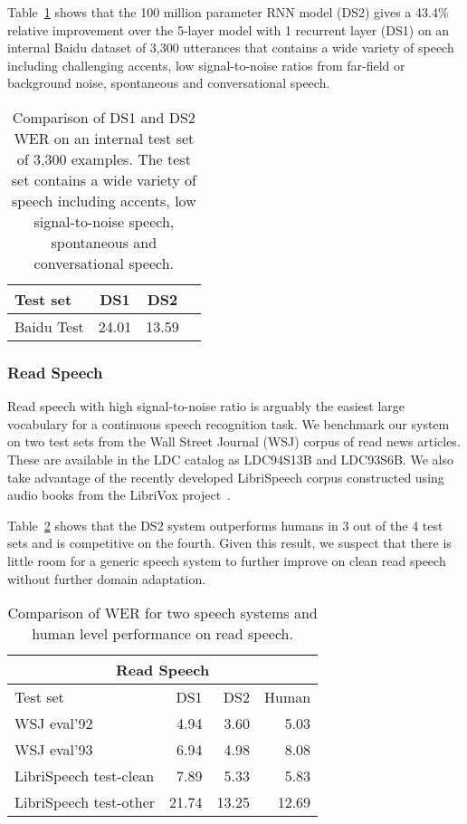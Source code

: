Table~\ref{table:deepspeech2:test} shows that the 100 million parameter RNN
model (DS2) gives a 43.4\% relative improvement over the 5-layer model with 1
recurrent layer (DS1) on an internal Baidu dataset of 3,300 utterances that
contains a wide variety of speech including challenging accents, low
signal-to-noise ratios from far-field or background noise, spontaneous and
conversational speech. 

\begin{table}
\centering
\begin{tabular}{l  c  c  c}
\toprule
Test set   & DS1 & DS2 \\
\midrule
Baidu Test & 24.01  & 13.59 \\
\bottomrule
\end{tabular}
\caption{Comparison of DS1 and DS2 WER on an internal test set of 3,300
    examples. The test set contains a wide variety of speech including accents,
    low signal-to-noise speech, spontaneous and conversational speech.}
\label{table:deepspeech2:test}
\end{table}

\subsubsection{Read Speech}

Read speech with high signal-to-noise ratio is arguably the easiest large
vocabulary for a continuous speech recognition task. We benchmark our system on
two test sets from the Wall Street Journal (WSJ) corpus of read news articles.
These are available in the LDC catalog as LDC94S13B and LDC93S6B. We also take
advantage of the recently developed LibriSpeech corpus constructed using audio
books from the LibriVox project~\cite{panayotov2015}.

Table~\ref{table:deepspeech2:readspeech} shows that the DS2 system outperforms
humans in 3 out of the 4 test sets and is competitive on the fourth. Given this
result, we suspect that there is little room for a generic speech system to
further improve on clean read speech without further domain adaptation.

\begin{table}
\centering
\begin{tabular}{l  r  r r}
\toprule
\multicolumn{4}{c}{Read Speech}\\
\midrule
Test set               & DS1   & DS2 &  Human \\ 
\midrule
WSJ eval'92            & 4.94  & 3.60  & 5.03 \\ 
WSJ eval'93            & 6.94  & 4.98  & 8.08 \\ 
LibriSpeech test-clean & 7.89  & 5.33  & 5.83 \\ 
LibriSpeech test-other & 21.74 & 13.25 & 12.69 \\ 
\bottomrule
\end{tabular}
\caption{Comparison of WER for two speech systems and human level performance
         on read speech.}
\label{table:deepspeech2:readspeech}
\end{table}

